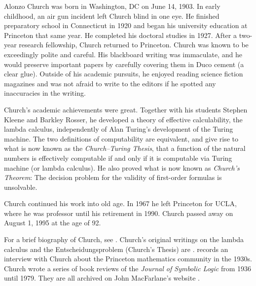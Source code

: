 \documentclass[../../../include/open-logic-section]{subfiles}
\begin{document}



Alonzo Church was born in Washington, DC on June 14, 1903.  In early
childhood, an air gun incident left Church blind in one eye. He
finished preparatory school in Connecticut in 1920 and began his
university education at Princeton that same year. He completed his
doctoral studies in 1927. After a two-year research fellowship, Church returned
to Princeton. Church was known to be exceedingly polite and careful. His
blackboard writing was immaculate, and he would preserve important
papers by carefully covering them in Duco cement (a clear
glue). Outside of his academic pursuits, he enjoyed reading science
fiction magazines and was not afraid to write to the editors if he
spotted any inaccuracies in the writing.

Church's academic achievements were great.  Together with his students
Stephen Kleene and Barkley Rosser, he developed a theory of effective
calculability, the lambda calculus, independently of Alan Turing's
development of the Turing machine. The two definitions of
computability are equivalent, and give rise to what is now known as
the \emph{Church--Turing Thesis}, that a function of the natural
numbers is effectively computable if and only if it is computable via
Turing machine (or lambda calculus). He also proved what is now known
as \emph{Church's Theorem}: The decision problem for the validity of
first-order formulas is unsolvable.

Church continued his work into old age. In 1967 he left Princeton for
UCLA, where he was professor until his retirement in 1990. Church
passed away on August 1, 1995 at the age of 92.

\begin{reading} 
For a brief biography of Church, see \citet{EndertonND}.  Church's
original writings on the lambda calculus and the Entscheidungsproblem
(Church's Thesis) are \citet{Church1936,Church1936a}.
\citet{Aspray1984} records an interview with Church about the
Princeton mathematics community in the 1930s.
Church wrote a series of book reviews of the \emph{Journal of
Symbolic Logic} from 1936 until 1979. They are all archived on John
MacFarlane's website \citep{MacFarlane2015}.
\end{reading} 
\end{document}
